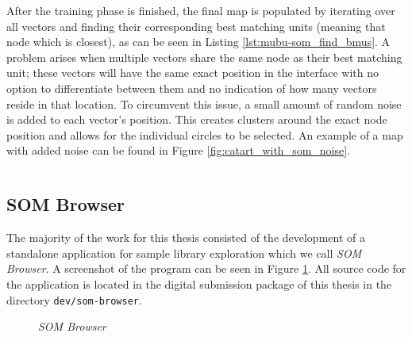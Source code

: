 \smallskip

After the training phase is finished, the final map is populated by iterating
over all vectors and finding their corresponding best matching units (meaning
that node which is closest), as can be seen in Listing
\ref{lst:mubu-som_find_bmus}. A problem arises when multiple vectors share the
same node as their best matching unit; these vectors will have the same exact
position in the interface with no option to differentiate between them and no
indication of how many vectors reside in that location. To circumvent this
issue, a small amount of random noise is added to each vector's position. This
creates clusters around the exact node position and allows for the individual
circles to be selected. An example of a map with added noise can be found in
Figure \ref{fig:catart_with_som_noise}.

\begin{listing}[!htb]
  \begin{mdframed}
    \inputminted[breaklines, numbers=left, firstline=316, lastline=335,
    fontsize=\footnotesize]{js}{../dev/mubu-som-js/descriptor_som.js}
  \end{mdframed}
  \caption[\texttt{dev/mubu-som-js/descriptor\_som.js}: \gls{bmu}
  identification]
  {\texttt{dev/mubu-som-js/descriptor\_som.js}: \glspl{bmu} for each vector are
  identified in \texttt{findBestMatches()}. This Listing implements
  equation \ref{eq:bmu} from Section \ref{subsubsec:som_math_definition}.}
  \label{lst:mubu-som_find_bmus}
\end{listing}

\clearpage

\subsection{SOM Browser}
\label{subsec:implementation_som-browser}

The majority of the work for this thesis consisted of the development of a
standalone application for sample library exploration which we call
\textit{SOM Browser}. A screenshot of the program can be seen in Figure
\ref{fig:som-browser}. All source code for the application is located in the
digital submission package of this thesis in the directory
\texttt{dev/som-browser}.

\begin{figure}[!htb]
  \centering
  \caption{\textit{SOM Browser}}
  \label{fig:som-browser}
\end{figure}

